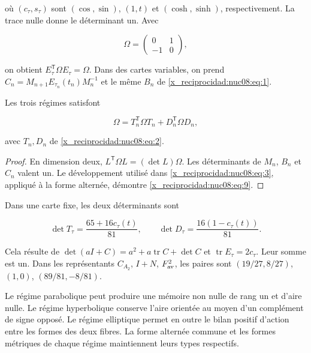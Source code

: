 où \((c_\tau,s_\tau)\) sont \((\cos,\sin)\), \((1,t)\) et \((\cosh,\sinh)\), respectivement. La trace nulle donne le déterminant un. Avec

\[
\Omega=\begin{pmatrix}0&1\\-1&0\end{pmatrix},
\]

on obtient \(E_\tau^\mathsf T\Omega E_\tau=\Omega\). Dans des cartes variables, on prend
\(C_n=M_{n+1}E_{\tau_n}(t_n)M_n^{-1}\) et le même \(B_n\) de \eqref{x_reciprocidad:nuc08:eq:1}.

\begin{theorem}
Les trois régimes satisfont

\begin{equation}
\boxed{\Omega=T_n^\mathsf T\Omega T_n+D_n^\mathsf T\Omega D_n,}
\label{x_reciprocidad:nuc08:eq:9}
\end{equation}

avec \(T_n,D_n\) de \eqref{x_reciprocidad:nuc08:eq:2}.
\end{theorem}

\begin{proof}
En dimension deux, \(L^\mathsf T\Omega L=(\det L)\Omega\). Les déterminants de \(M_n\), \(B_n\) et \(C_n\) valent un. Le développement utilisé dans \eqref{x_reciprocidad:nuc08:eq:3}, appliqué à la forme alternée, démontre \eqref{x_reciprocidad:nuc08:eq:9}.
\end{proof}

Dans une carte fixe, les deux déterminants sont

\begin{equation}
\det T_\tau=\frac{65+16c_\tau(t)}{81},\qquad
\det D_\tau=\frac{16(1-c_\tau(t))}{81}.
\label{x_reciprocidad:nuc08:eq:10}
\end{equation}

Cela résulte de \(\det(aI+C)=a^2+a\operatorname{tr}C+\det C\) et \(\operatorname{tr}E_\tau=2c_\tau\). Leur somme est un. Dans les représentants \(C_{A_2}\), \(I+N\), \(F_{\rm av}^2\), les paires sont \((19/27,8/27)\), \((1,0)\), \((89/81,-8/81)\).

Le régime parabolique peut produire une mémoire non nulle de rang un et d’aire nulle. Le régime hyperbolique conserve l’aire orientée au moyen d’un complément de signe opposé. Le régime elliptique permet en outre le bilan positif d’action entre les formes des deux fibres. La forme alternée commune et les formes métriques de chaque régime maintiennent leurs types respectifs.

